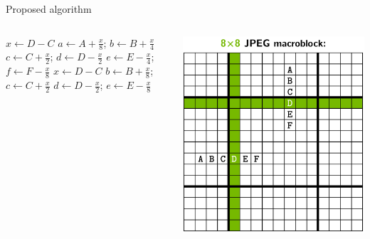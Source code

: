 \documentclass[aspectratio=1610]{beamer}
\begin{document}
\begin{frame}{\textcolor{NvidiaGreen}{Proposed algorithm}}
    \begin{columns}[c]
            \centering
            \begin{algorithm}[H]
                {
                    {
                         $x\gets D-C$\;
                         $a\gets A+\frac{x}{8}$;
                         $b\gets B+\frac{x}{4}$\;
                         $c\gets C+\frac{x}{2}$;
                         $d\gets D-\frac{x}{2}$\;
                         $e\gets E-\frac{x}{4}$;
                         $f\gets F-\frac{x}{8}$\;
                    }
                }{
                    {
                         $x\gets D-C$\;
                         $b\gets B+\frac{x}{8}$;
                         $c\gets C+\frac{x}{2}$\;
                         $d\gets D-\frac{x}{2}$;
                         $e\gets E-\frac{x}{8}$\;
                    }
                }
            \end{algorithm}
            \centering
             \includegraphics[height=\dimexpr\textheight-4\baselineskip-\abovecaptionskip-\belowcaptionskip\relax,keepaspectratio]{macroblock2.pdf}
    \end{columns}
\end{frame}
\end{document}
